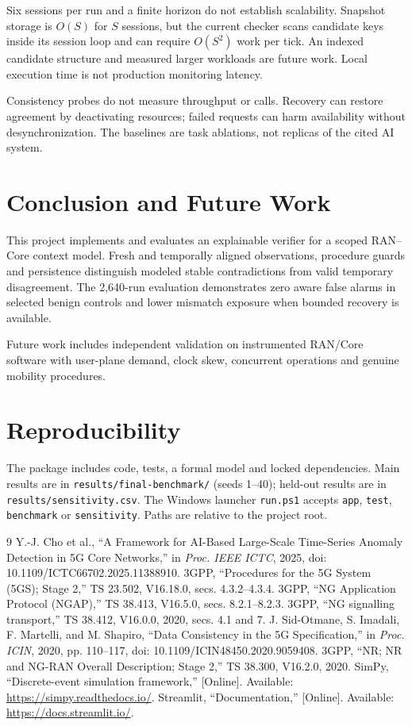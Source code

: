 \documentclass[conference]{IEEEtran}
\begin{document}
Six sessions per run and a finite horizon do not establish scalability. Snapshot storage is $O(S)$ for $S$ sessions, but the current checker scans candidate keys inside its session loop and can require $O(S^2)$ work per tick. An indexed candidate structure and measured larger workloads are future work. Local execution time is not production monitoring latency.

Consistency probes do not measure throughput or calls. Recovery can restore agreement by deactivating resources; failed requests can harm availability without desynchronization. The baselines are task ablations, not replicas of the cited AI system.

\section{Conclusion and Future Work}
This project implements and evaluates an explainable verifier for a scoped RAN--Core context model. Fresh and temporally aligned observations, procedure guards and persistence distinguish modeled stable contradictions from valid temporary disagreement. The 2,640-run evaluation demonstrates zero aware false alarms in selected benign controls and lower mismatch exposure when bounded recovery is available.

Future work includes independent validation on instrumented RAN/Core software with user-plane demand, clock skew, concurrent operations and genuine mobility procedures.

\section*{Reproducibility}
The package includes code, tests, a formal model and locked dependencies. Main results are in \texttt{results/final-benchmark/} (seeds 1--40); held-out results are in \texttt{results/sensitivity.csv}. The Windows launcher \texttt{run.ps1} accepts \texttt{app}, \texttt{test}, \texttt{benchmark} or \texttt{sensitivity}. Paths are relative to the project root.

\begin{thebibliography}{9}
 Y.-J. Cho et al., ``A Framework for AI-Based Large-Scale Time-Series Anomaly Detection in 5G Core Networks,'' in \textit{Proc. IEEE ICTC}, 2025, doi: 10.1109/ICTC66702.2025.11388910.
 3GPP, ``Procedures for the 5G System (5GS); Stage 2,'' TS 23.502, V16.18.0, secs. 4.3.2--4.3.4.
 3GPP, ``NG Application Protocol (NGAP),'' TS 38.413, V16.5.0, secs. 8.2.1--8.2.3.
 3GPP, ``NG signalling transport,'' TS 38.412, V16.0.0, 2020, secs. 4.1 and 7.
 J. Sid-Otmane, S. Imadali, F. Martelli, and M. Shapiro, ``Data Consistency in the 5G Specification,'' in \textit{Proc. ICIN}, 2020, pp. 110--117, doi: 10.1109/ICIN48450.2020.9059408.
 3GPP, ``NR; NR and NG-RAN Overall Description; Stage 2,'' TS 38.300, V16.2.0, 2020.
 SimPy, ``Discrete-event simulation framework,'' [Online]. Available: \url{https://simpy.readthedocs.io/}.
 Streamlit, ``Documentation,'' [Online]. Available: \url{https://docs.streamlit.io/}.
\end{thebibliography}
\end{document}
